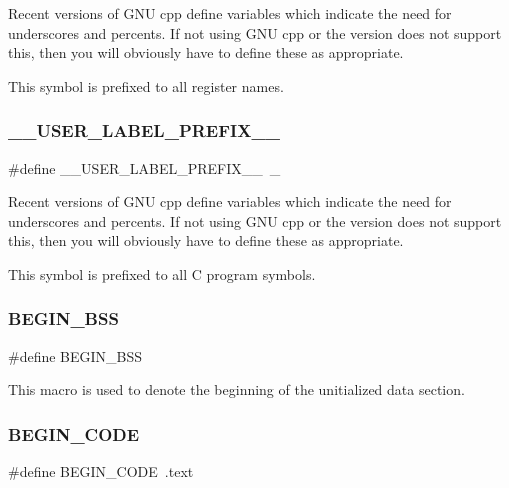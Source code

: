 Recent versions of G\+NU cpp define variables which indicate the need for underscores and percents. If not using G\+NU cpp or the version does not support this, then you will obviously have to define these as appropriate.

This symbol is prefixed to all register names. \mbox{\label{group__RTEMSScoreCPUV850ASM_gaff6bf0ff0fa3b5cbd23a8ae1131c87a9}} 
\subsubsection{\texorpdfstring{\_\_USER\_LABEL\_PREFIX\_\_}{\_\_USER\_LABEL\_PREFIX\_\_}}
{\footnotesize\ttfamily \#define \+\_\+\+\_\+\+U\+S\+E\+R\+\_\+\+L\+A\+B\+E\+L\+\_\+\+P\+R\+E\+F\+I\+X\+\_\+\+\_\+~\+\_\+}

Recent versions of G\+NU cpp define variables which indicate the need for underscores and percents. If not using G\+NU cpp or the version does not support this, then you will obviously have to define these as appropriate.

This symbol is prefixed to all C program symbols. \mbox{\label{group__RTEMSScoreCPUV850ASM_ga50f110f0489e48ceda4a0473a35d2978}} 
\subsubsection{\texorpdfstring{BEGIN\_BSS}{BEGIN\_BSS}}
{\footnotesize\ttfamily \#define B\+E\+G\+I\+N\+\_\+\+B\+SS}

This macro is used to denote the beginning of the unitialized data section. \mbox{\label{group__RTEMSScoreCPUV850ASM_ga6d6dc213aff5b736968e2aff37eb2c99}} 
\subsubsection{\texorpdfstring{BEGIN\_CODE}{BEGIN\_CODE}}
{\footnotesize\ttfamily \#define B\+E\+G\+I\+N\+\_\+\+C\+O\+DE~.text}

